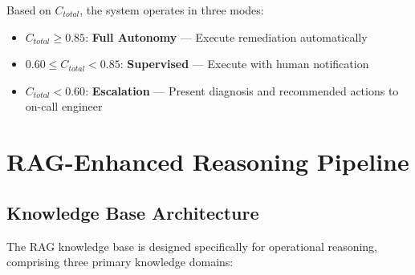 \documentclass[journal]{IEEEtran}
\begin{document}
Based on $C_{total}$, the system operates in three modes:
\begin{itemize}
    \item $C_{total} \geq 0.85$: \textbf{Full Autonomy} — Execute remediation automatically
    \item $0.60 \leq C_{total} < 0.85$: \textbf{Supervised} — Execute with human notification
    \item $C_{total} < 0.60$: \textbf{Escalation} — Present diagnosis and recommended actions to on-call engineer
\end{itemize}

\section{RAG-Enhanced Reasoning Pipeline}
\label{sec:rag_pipeline}

\subsection{Knowledge Base Architecture}

The RAG knowledge base is designed specifically for operational reasoning, comprising three primary knowledge domains:
\end{document}

